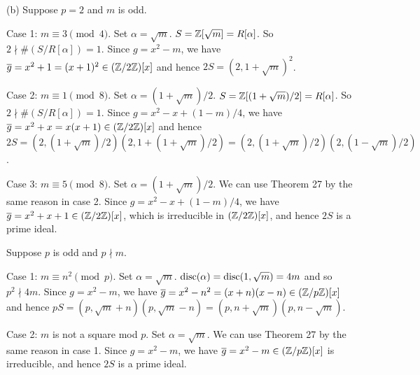 \documentclass[../Marcus.tex]{subfiles}
\begin{document}
(b) Suppose $p=2$ and $m$ is odd.

Case 1: $m\equiv3\pmod{4}$. Set $\alpha=\sqrt{m}$. $S=\mathbb{Z}[\sqrt{m}]=R[\alpha]$. So $2\nmid \#(S/R[\alpha])=1$. Since $g=x^2-m$, we have $\overline{g}=x^2+1=(x+1)^2\in(\mathbb{Z}/2\mathbb{Z})[x]$ and hence $2S=(2,1+\sqrt{m})^2$.

Case 2: $m\equiv1\pmod{8}$. Set $\alpha=(1+\sqrt{m})/2$. $S=\mathbb{Z}[(1+\sqrt{m})/2]=R[\alpha]$. So $2\nmid \#(S/R[\alpha])=1$. Since $g=x^2-x+(1-m)/4$, we have $\overline{g}=x^2+x=x(x+1)\in(\mathbb{Z}/2\mathbb{Z})[x]$ and hence $2S=(2,(1+\sqrt{m})/2)(2,1+(1+\sqrt{m})/2)=(2,(1+\sqrt{m})/2)(2,(1-\sqrt{m})/2)$.

Case 3: $m\equiv5\pmod{8}$. Set $\alpha=(1+\sqrt{m})/2$. We can use Theorem 27 by the same reason in case 2. Since $g=x^2-x+(1-m)/4$, we have $\overline{g}=x^2+x+1\in(\mathbb{Z}/2\mathbb{Z})[x]$, which is irreducible in $(\mathbb{Z}/2\mathbb{Z})[x]$, and hence $2S$ is a prime ideal.

Suppose $p$ is odd and $p\nmid m$.

Case 1: $m\equiv n^2\pmod{p}$. Set $\alpha=\sqrt{m}$. $\operatorname{disc}(\alpha)=\operatorname{disc}(1,\sqrt{m})=4m$ and so $p^2\nmid 4m$. Since $g=x^2-m$, we have $\overline{g}=x^2-n^2=(x+n)(x-n)\in(\mathbb{Z}/p\mathbb{Z})[x]$ and hence $pS=(p,\sqrt{m}+n)(p,\sqrt{m}-n)=(p,n+\sqrt{m})(p,n-\sqrt{m})$.

Case 2: $m$ is not a square mod $p$. Set $\alpha=\sqrt{m}$. We can use Theorem 27 by the same reason in case 1. Since $g=x^2-m$, we have $\overline{g}=x^2-m\in(\mathbb{Z}/p\mathbb{Z})[x]$ is irreducible, and hence $2S$ is a prime ideal.
\end{document}
